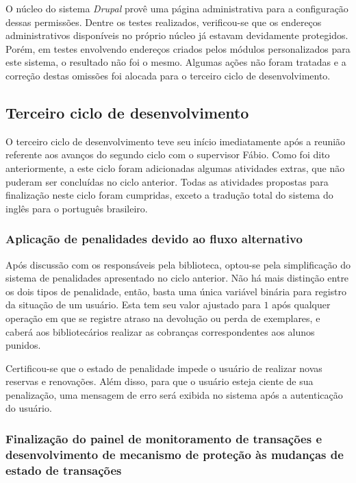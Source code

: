 \documentclass[a4paper]{article}
\begin{document}
O núcleo do sistema \textit{Drupal} provê uma página administrativa para a configuração dessas permissões. Dentre os testes realizados, verificou-se que os endereços administrativos disponíveis no próprio núcleo já estavam devidamente protegidos. Porém, em testes envolvendo endereços criados pelos módulos personalizados para este sistema, o resultado não foi o mesmo. Algumas ações não foram tratadas e a correção destas omissões foi alocada para o terceiro ciclo de desenvolvimento.

\pagebreak
\subsection{Terceiro ciclo de desenvolvimento}

O terceiro ciclo de desenvolvimento teve seu início imediatamente após a reunião referente aos avanços do segundo ciclo com o supervisor Fábio. Como foi dito anteriormente, a este ciclo foram adicionadas algumas atividades extras, que não puderam ser concluídas no ciclo anterior. Todas as atividades propostas para finalização neste ciclo foram cumpridas, exceto a tradução total do sistema do inglês para o português brasileiro.

\subsubsection{Aplicação de penalidades devido ao fluxo alternativo}
    
Após discussão com os responsáveis pela biblioteca, optou-se pela simplificação do sistema de penalidades apresentado no ciclo anterior. Não há mais distinção entre os dois tipos de penalidade, então, basta uma única variável binária para registro da situação de um usuário. Esta tem seu valor ajustado para $1$ após qualquer operação em que se registre atraso na devolução ou perda de exemplares, e caberá aos bibliotecários realizar as cobranças correspondentes aos alunos punidos.
    
Certificou-se que o estado de penalidade impede o usuário de realizar novas reservas e renovações. Além disso, para que o usuário esteja ciente de sua penalização, uma mensagem de erro será exibida no sistema após a autenticação do usuário. 

\subsubsection{Finalização do painel de monitoramento de transações e desenvolvimento de mecanismo de proteção às mudanças de estado de transações}
    
\end{document}
